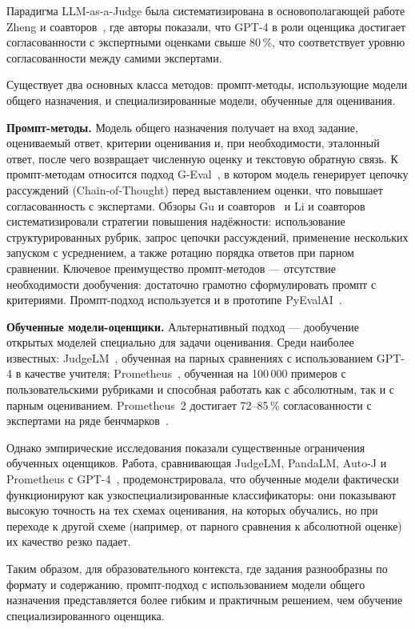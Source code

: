 Парадигма LLM-as-a-Judge была систематизирована в основополагающей работе Zheng и соавторов~\cite{zheng2023judging}, где авторы показали, что GPT-4 в роли оценщика достигает согласованности с экспертными оценками свыше 80\,\%, что соответствует уровню согласованности между самими экспертами. 

Существует два основных класса методов: промпт-методы, использующие модели общего назначения, и специализированные модели, обученные для оценивания.

\textbf{Промпт-методы.} Модель общего назначения получает на вход задание, оцениваемый ответ, критерии оценивания и, при необходимости, эталонный ответ, после чего возвращает численную оценку и текстовую обратную связь. К промпт-методам относится подход G-Eval~\cite{liu2023geval}, в котором модель генерирует цепочку рассуждений (Chain-of-Thought) перед выставлением оценки, что повышает согласованность с экспертами. Обзоры Gu и соавторов~\cite{gu2024survey} и Li и соавторов~\cite{li2024llmsasjudges} систематизировали стратегии повышения надёжности: использование структурированных рубрик, запрос цепочки рассуждений, применение нескольких запуском с усреднением, а также ротацию порядка ответов при парном сравнении. Ключевое преимущество промпт-методов --- отсутствие необходимости дообучения: достаточно грамотно сформулировать промпт с критериями. Промпт-подход используется и в прототипе PyEvalAI~\cite{pyevalai}.

\textbf{Обученные модели-оценщики.} Альтернативный подход --- дообучение открытых моделей специально для задачи оценивания. Среди наиболее известных: JudgeLM~\cite{zhu2024judgelm}, обученная на парных сравнениях с использованием GPT-4 в качестве учителя; Prometheus~\cite{kim2023prometheus}, обученная на 100\,000 примеров с пользовательскими рубриками и способная работать как с абсолютным, так и с парным оцениванием. Prometheus~2 достигает 72--85\,\% согласованности с экспертами на ряде бенчмарков~\cite{kim2024prometheus2}.

Однако эмпирические исследования показали существенные ограничения обученных оценщиков. Работа, сравнивающая JudgeLM, PandaLM, Auto-J и Prometheus с GPT-4~\cite{huang2024empirical}, продемонстрировала, что обученные модели фактически функционируют как узкоспециализированные классификаторы: они показывают высокую точность на тех схемах оценивания, на которых обучались, но при переходе к другой схеме (например, от парного сравнения к абсолютной оценке) их качество резко падает. 

Таким образом, для образовательного контекста, где задания разнообразны по формату и содержанию, промпт-подход с использованием модели общего назначения представляется более гибким и практичным решением, чем обучение специализированного оценщика.


